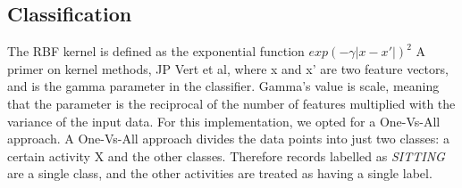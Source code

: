     \subsection{Classification}
        The RBF kernel is defined as the exponential function \(exp(-\gamma \lvert x-x' \rvert)^2\) A primer on kernel methods, JP Vert et al, where x and x’ are two feature vectors, and is the
        gamma parameter in the classifier. Gamma’s value is scale, meaning that the parameter is the reciprocal of the number of features multiplied with the variance of the input data.
        For this implementation, we opted for a One-Vs-All approach. A One-Vs-All approach divides the data points into just two classes: a certain activity X and the other classes. Therefore records 
        labelled as \emph{SITTING} are a single class, and the other activities are treated as having a single label.
